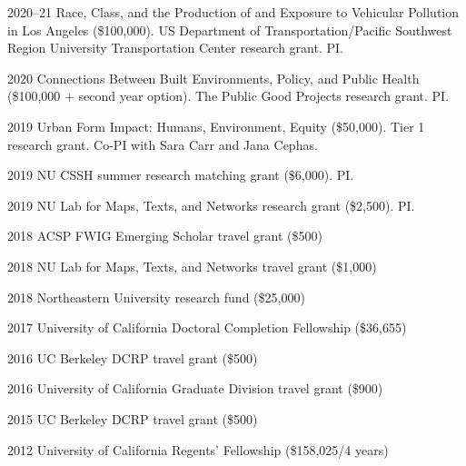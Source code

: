 \documentclass[12pt,letterpaper]{report}
\begin{document}
    \begin{tablist}

        \item[2020--21] \tab Race, Class, and the Production of and Exposure to Vehicular Pollution in Los Angeles (\$100,000). US Department of Transportation/Pacific Southwest Region University Transportation Center research grant. PI.

        \item[2020] \tab Connections Between Built Environments, Policy, and Public Health (\$100,000 + second year option). The Public Good Projects research grant. PI.

        \item[2019] \tab Urban Form Impact: Humans, Environment, Equity (\$50,000). Tier 1 research grant. Co-PI with Sara Carr and Jana Cephas.

        \item[2019] \tab NU CSSH summer research matching grant (\$6,000). PI.

        \item[2019] \tab NU Lab for Maps, Texts, and Networks research grant (\$2,500). PI.

        \item[2018] \tab ACSP FWIG Emerging Scholar travel grant (\$500)

        \item[2018] \tab NU Lab for Maps, Texts, and Networks travel grant (\$1,000)

        \item[2018] \tab Northeastern University research fund (\$25,000)

        \item[2017] \tab University of California Doctoral Completion Fellowship (\$36,655)

        \item[2016] \tab UC Berkeley DCRP travel grant (\$500)

        \item[2016] \tab University of California Graduate Division travel grant (\$900)

        \item[2015] \tab UC Berkeley DCRP travel grant (\$500)

        \item[2012] \tab University of California Regents' Fellowship (\$158,025/4 years)

    \end{tablist}
\end{document}
